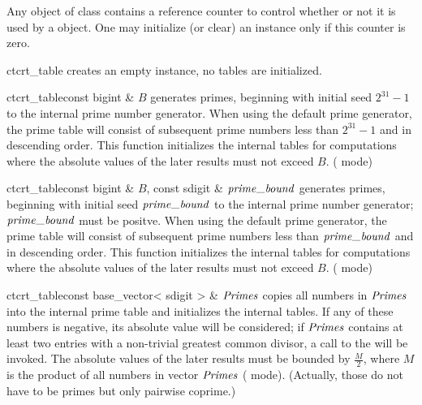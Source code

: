 Any object of class  contains a reference counter to control whether or not it
is used by a  object.  One may initialize (or clear) an instance only if this counter
is zero.



\CONS

\begin{fcode}{ct}{crt_table}{}
  creates an empty instance, no tables are initialized.
\end{fcode}

\begin{fcode}{ct}{crt_table}{const bigint & $B$}
  generates primes, beginning with initial seed $2^{31}-1$ to the internal prime number
  generator.  When using the default prime generator, the prime table will consist of subsequent
  prime numbers less than $2^{31}-1$ and in descending order.  This function initializes the
  internal tables for computations where the absolute values of the later results must not
  exceed $B$.  ( mode)
\end{fcode}

\begin{fcode}{ct}{crt_table}{const bigint & $B$, const sdigit & $\primebound$}
  generates primes, beginning with initial seed $\primebound$ to the internal prime number
  generator; $\primebound$ must be positve.  When using the default prime generator, the prime
  table will consist of subsequent prime numbers less than $\primebound$ and in descending
  order.  This function initializes the internal tables for computations where the absolute
  values of the later results must not exceed $B$.  ( mode)
\end{fcode}

\begin{fcode}{ct}{crt_table}{const base_vector< sdigit > & $\mathit{Primes}$}
  copies all numbers in $\mathit{Primes}$ into the internal prime table and initializes the internal
  tables.  If any of these numbers is negative, its absolute value will be considered; if
  $\mathit{Primes}$ contains at least two entries with a non-trivial greatest common divisor, a call to
  the \LEH will be invoked.  The absolute values of the later results must be bounded by
  $\frac{M}{2}$, where $M$ is the product of all numbers in vector $\mathit{Primes}$ (
  mode).  (Actually, those do not have to be primes but only pairwise coprime.)
\end{fcode}

